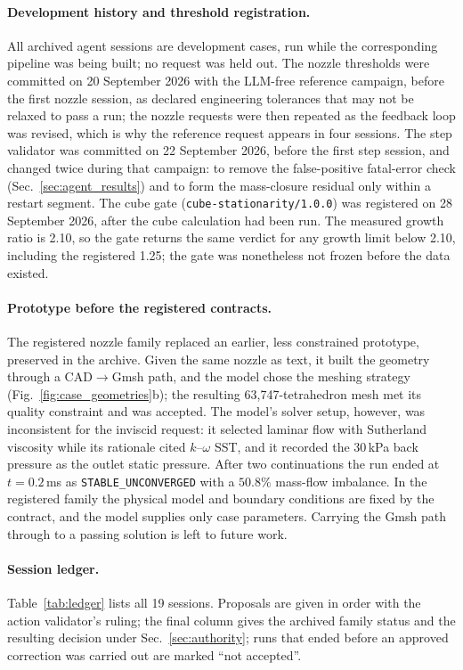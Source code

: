 \documentclass[11pt]{article}
\begin{document}
\paragraph{Development history and threshold registration.} All archived
agent sessions are development cases, run while the corresponding pipeline was
being built; no request was held out. The nozzle thresholds were committed on
20 September 2026 with the LLM-free reference campaign, before the first
nozzle session, as declared engineering tolerances that may not be relaxed to
pass a run; the nozzle requests were then repeated as the feedback loop was
revised, which is why the reference request appears in four sessions. The
step validator was committed on 22 September 2026, before the first step
session, and changed twice during that campaign: to remove the false-positive
fatal-error check (Sec.~\ref{sec:agent_results}) and to form the mass-closure
residual only within a restart segment. The cube gate
(\texttt{cube-stationarity/1.0.0}) was registered on 28 September 2026, after
the cube calculation had been run. The measured growth ratio is 2.10, so the
gate returns the same verdict for any growth limit below 2.10, including the
registered 1.25; the gate was nonetheless not frozen before the data existed.

\paragraph{Prototype before the registered contracts.} The registered nozzle
family replaced an earlier, less constrained prototype, preserved in the
archive. Given the same nozzle as text, it built the geometry through a
CAD$\rightarrow$Gmsh path, and the model chose the meshing strategy
(Fig.~\ref{fig:case_geometries}b); the resulting 63,747-tetrahedron mesh met
its quality constraint and was accepted. The model's solver setup, however,
was inconsistent for the inviscid request: it selected laminar flow with
Sutherland viscosity while its rationale cited $k$--$\omega$ SST, and it
recorded the 30\,kPa back pressure as the outlet static pressure. After two
continuations the run ended at $t=0.2$\,ms as \texttt{STABLE\_UNCONVERGED}
with a $50.8\%$ mass-flow imbalance. In the registered family the physical
model and boundary conditions are fixed by the contract, and the model
supplies only case parameters. Carrying the Gmsh path through to a passing
solution is left to future work.

\paragraph{Session ledger.} Table~\ref{tab:ledger} lists all 19 sessions.
Proposals are given in order with the action validator's ruling; the final
column gives the archived family status and the resulting decision under
Sec.~\ref{sec:authority}; runs that ended before an approved correction was
carried out are marked ``not accepted''.
\end{document}
